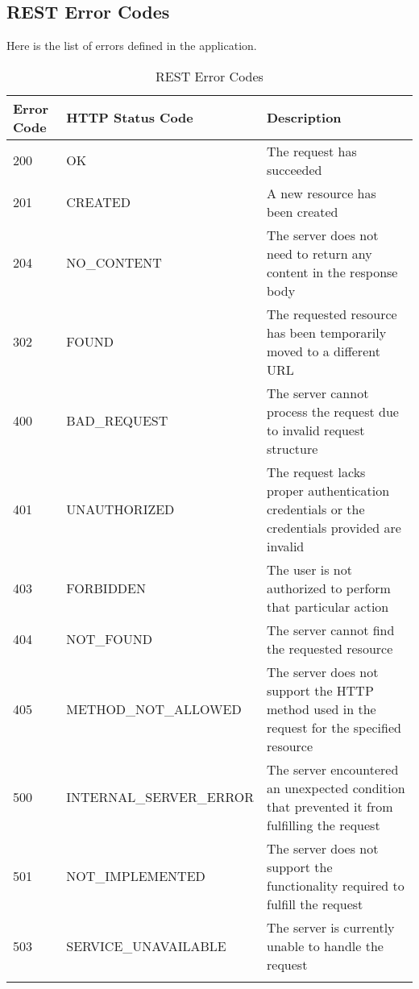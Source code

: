 \subsection{REST Error Codes}

Here is the list of errors defined in the application. 

\begin{longtable}{|p{}|p{} |p{}|} 
\hline
\textbf{Error Code} & \textbf{HTTP Status Code} & \textbf{Description} \\\hline
200 & OK &  The request has succeeded \\\hline
201 & CREATED &  A new resource has been created \\\hline
204 & NO\_CONTENT &  The server does not need to return any content in the response body \\\hline
302 & FOUND &  The requested resource has been temporarily moved to a different URL \\\hline
400 & BAD\_REQUEST & The server cannot process the request due to invalid request structure \\\hline
401 & UNAUTHORIZED &  The request lacks proper authentication credentials or the credentials provided are invalid\\\hline
403 & FORBIDDEN &  The user is not authorized to perform that particular action \\\hline
404 & NOT\_FOUND &  The server cannot find the requested resource \\\hline
405 & METHOD\_NOT\_ALLOWED &  The server does not support the HTTP method used in the request for the specified resource \\\hline
500 & INTERNAL\_SERVER\_ERROR &  The server encountered an unexpected condition that prevented it from fulfilling the request \\\hline
501 & NOT\_IMPLEMENTED &  The server does not support the functionality required to fulfill the request \\\hline
503 & SERVICE\_UNAVAILABLE &  The server is currently unable to handle the request \\\hline
\caption{REST Error Codes}
\label{tab:termGlossary}
\end{longtable}
